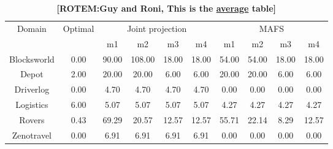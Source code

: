 \documentclass{article}
\newcommand{\rotem}[1]{\textbf{\color{red}[ROTEM:#1]}}
\theoremstyle{remark}
\begin{document}
{%
\begin{table}[ht]
\begin{tabular}{|c|c|c|c|c|c|c|c|c|c|}
\hline
\multirow{2}{*}{Domain} & \multirow{2}{*}{Optimal} & \multicolumn{4}{c|}{Joint   projection} & \multicolumn{4}{c|}{MAFS}     \\
                        &                          & m1       & m2       & m3      & m4      & m1    & m2    & m3    & m4    \\ \hline
Blocksworld             & 0.00                     & 90.00    & 108.00   & 18.00   & 18.00   & 54.00 & 54.00 & 18.00 & 18.00 \\ \hline
Depot                   & 2.00                     & 20.00    & 20.00    & 6.00    & 6.00    & 20.00 & 20.00 & 6.00  & 6.00  \\ \hline
Driverlog               & 0.00                     & 4.70     & 4.70     & 4.70    & 4.70    & 0.00  & 0.00  & 0.00  & 0.00  \\ \hline
Logistics               & 6.00                     & 5.07     & 5.07     & 5.07    & 5.07    & 4.27  & 4.27  & 4.27  & 4.27  \\ \hline
Rovers                  & 0.43                     & 69.29    & 20.57    & 12.57   & 12.57   & 55.71 & 22.14 & 8.29  & 12.57 \\ \hline
Zenotravel              & 0.00                     & 6.91     & 6.91     & 6.91    & 6.91    & 0.00  & 0.00  & 0.00  & 0.00  \\ \hline
\end{tabular}
\caption{\rotem{Guy and Roni, This is the \underline{average} table}}
\label{table:optimalTableAvg}
\end{table}

}
\end{document}
